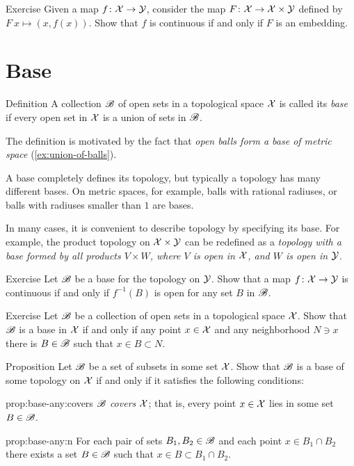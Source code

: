 \begin{thm}{Exercise}
Given a map $f\colon\mathcal{X}\to \mathcal{Y}$, consider the map $F\colon\mathcal{X}\to \mathcal{X}\times\mathcal{Y}$ defined by $F\:x\mapsto (x,f(x))$.
Show that $f$ is continuous if and only if $F$ is an embedding.
\end{thm}


\section{Base}

\begin{thm}{Definition}
A collection $\mathscr{B}$ of open sets in a topological space $\mathcal{X}$ is called its \emph{base} if every open set in $\mathcal{X}$ is a union of sets in $\mathscr{B}$.
\end{thm}

The definition is motivated by the fact that \textit{open balls form a base of metric space} (\ref{ex:union-of-balls}).

A base completely defines its topology,
but typically a topology has many different bases.
On metric spaces, for example, balls with rational radiuses, or balls with radiuses smaller than $1$ are bases.

In many cases, it is convenient to describe topology by specifying its base.
For example, the product topology on $\mathcal{X}\times\mathcal{Y}$ can be redefined as a \textit{topology with a base formed by all products $V\times W$, where $V$ is open in $\mathcal{X}$, and $W$ is open in $\mathcal{Y}$}.

\begin{thm}{Exercise}
Let $\mathscr{B}$ be a base for the topology on $\mathcal{Y}$.
Show that a map $f\colon \mathcal{X} \to \mathcal{Y}$ is continuous if and only if $f^{-1}(B)$ is open for any set $B$ in $\mathscr{B}$.

\end{thm}



\begin{thm}{Exercise}
Let $\mathscr{B}$ be a collection of open sets in a topological space $\mathcal{X}$.
Show that $\mathscr{B}$ is a base in $\mathcal{X}$ if and only if any point $x\in \mathcal{X}$ and any neighborhood $N\ni x$ there is $B\in  \mathscr{B}$ such that $x\in B\subset N$.
\end{thm}

\begin{thm}{Proposition}\label{prop:base-any}
Let $\mathscr{B}$ be a set of subsets in some set $\mathcal{X}$.
Show that $\mathscr{B}$ is a base of some topology on $\mathcal{X}$ if and only if it satisfies the following conditions:

\begin{subthm}{prop:base-any:covers}
$\mathscr{B}$ \emph{covers} $\mathcal{X}$;
that is, every point $x\in\mathcal{X}$ lies in some set $B\in \mathscr{B}$.
\end{subthm}

\begin{subthm}{prop:base-any:n}
For each pair of sets $B_1, B_2\in \mathscr{B}$ and each point $x \in B_1 \cap B_2$ there exists a set $B
\in \mathscr{B}$ such that $x\in B\subset B_1 \cap B_2$.
\end{subthm}

\end{thm}


